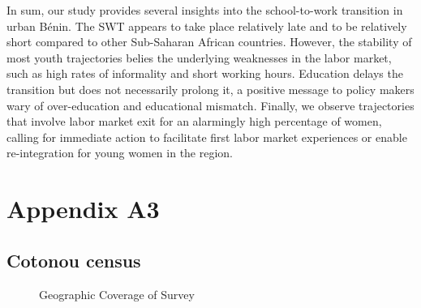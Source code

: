 \documentclass[
  a4paper, twoside, 12pt]{book}
\begin{document}
In sum, our study provides several insights into the school-to-work transition in urban Bénin. The SWT appears to take place relatively late and to be relatively short compared to other Sub-Saharan African countries. However, the stability of most youth trajectories belies the underlying weaknesses in the labor market, such as high rates of informality and short working hours. Education delays the transition but does not necessarily prolong it, a positive message to policy makers wary of over-education and educational mismatch. Finally, we observe trajectories that involve labor market exit for an alarmingly high percentage of women, calling for immediate action to facilitate first labor market experiences or enable re-integration for young women in the region.

\newpage
{}
\printbibliography[segment=\therefsegment,heading=subbibintoc,title={References}]

\newpage

\setcounter{figure}{0}
\renewcommand{\thefigure}{A3.\arabic{figure}}
\setcounter{table}{0}
\renewcommand{\thetable}{A3.\arabic{table}}
\setcounter{section}{0}
\renewcommand{\thesection}{\Alph{section}2}
\renewcommand{\thesubsection}{A3.\arabic{subsection}}

\hypertarget{survey-appendix-a}{%
\section*{Appendix A3}\label{survey-appendix-a}}


\hypertarget{survey-census}{%
\subsection*{Cotonou census}\label{survey-census}}


\begin{figure}[H] \caption{\label{fig:litt} Geographic Coverage of Survey}
\centering
{}
\end{figure}
\end{document}
